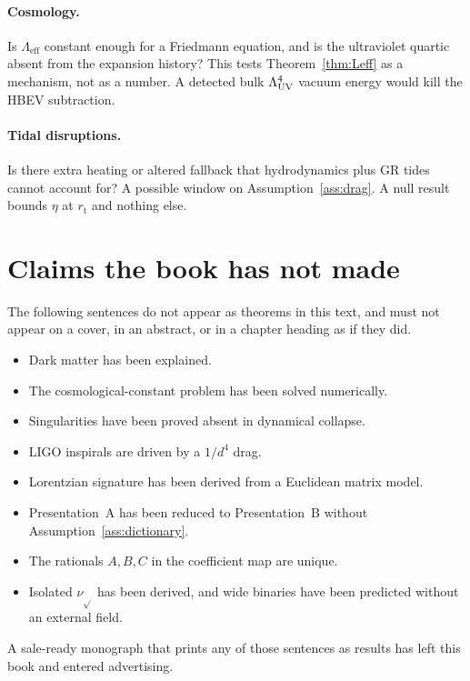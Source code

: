 \paragraph{Cosmology.}
Is \(\Lambda_{\mathrm{eff}}\) constant enough for a
Friedmann equation, and is the ultraviolet quartic absent from
the expansion history? This tests Theorem~\ref{thm:Leff} as a
mechanism, not as a number. A detected bulk \(\Lambda_{\mathrm{UV}}^4\) vacuum
energy would kill the HBEV subtraction.

\paragraph{Tidal disruptions.}
Is there extra heating or altered fallback that hydrodynamics
plus GR tides cannot account for? A possible window on
Assumption~\ref{ass:drag}. A null result bounds \(\eta\) at
\(r_{\mathrm{t}}\) and nothing else.

\section{Claims the book has not made}
\label{sec:ch16-not-made}

The following sentences do not appear as theorems in this text,
and must not appear on a cover, in an abstract, or in a chapter
heading as if they did.

\begin{itemize}
  \item Dark matter has been explained.
  \item The cosmological-constant problem has been solved
        numerically.
  \item Singularities have been proved absent in dynamical
        collapse.
  \item LIGO inspirals are driven by a \(1/d^4\) drag.
  \item Lorentzian signature has been derived from a Euclidean
        matrix model.
  \item Presentation~A has been reduced to Presentation~B without
        Assumption~\ref{ass:dictionary}.
  \item The rationals \(A,B,C\) in the coefficient map are unique.
  \item Isolated \(\nu_{\sqrt{}}\) has been derived, and wide
    binaries have been predicted without an external field.
\end{itemize}

A sale-ready monograph that prints any of those sentences as
results has left this book and entered advertising.

